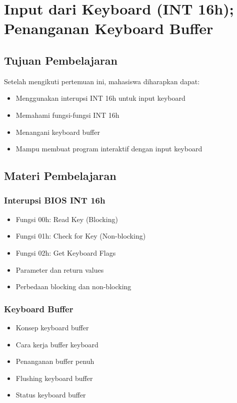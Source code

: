 \chapter{Input dari Keyboard (INT 16h); Penanganan Keyboard Buffer}

\section{Tujuan Pembelajaran}
Setelah mengikuti pertemuan ini, mahasiswa diharapkan dapat:
\begin{itemize}
\item Menggunakan interupsi INT 16h untuk input keyboard
\item Memahami fungsi-fungsi INT 16h
\item Menangani keyboard buffer
\item Mampu membuat program interaktif dengan input keyboard
\end{itemize}

\section{Materi Pembelajaran}

\subsection{Interupsi BIOS INT 16h}
\begin{itemize}
\item Fungsi 00h: Read Key (Blocking)
\item Fungsi 01h: Check for Key (Non-blocking)
\item Fungsi 02h: Get Keyboard Flags
\item Parameter dan return values
\item Perbedaan blocking dan non-blocking
\end{itemize}

\subsection{Keyboard Buffer}
\begin{itemize}
\item Konsep keyboard buffer
\item Cara kerja buffer keyboard
\item Penanganan buffer penuh
\item Flushing keyboard buffer
\item Status keyboard buffer
\end{itemize}

